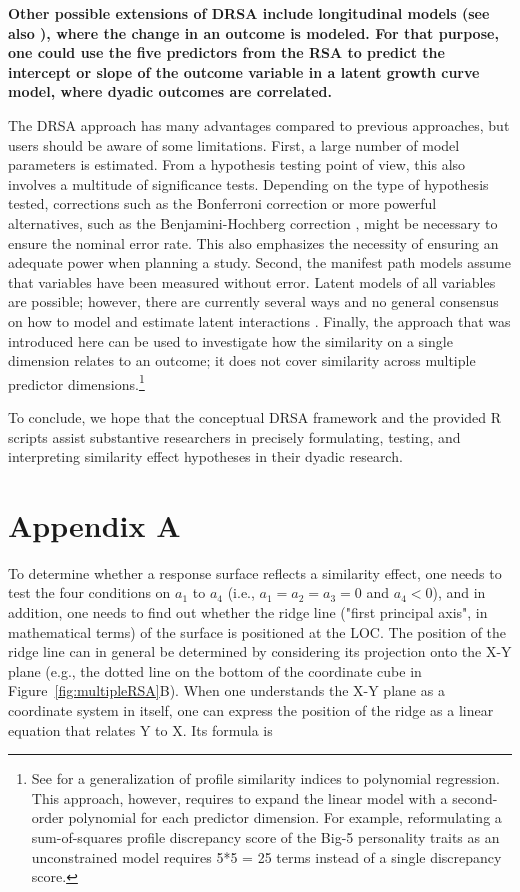 \documentclass[jou,a4paper,draftfirst]{apa6}
\newcommand{\added}[1]{\textcolor{colour_added}{\bf{#1}}}
\begin{document}
\added{Other possible extensions of DRSA include longitudinal models (see also \nptextcite{NestlerEtAl2015}), where the change in an outcome is modeled. For that purpose, one could use the five predictors from the RSA to predict the intercept or slope of the outcome variable in a latent growth curve model, where dyadic outcomes are correlated.}

The DRSA approach has many advantages compared to previous approaches, but users should be aware of some limitations. First, a large number of model parameters is estimated. From a hypothesis testing point of view, this also involves a multitude of significance tests. Depending on the type of hypothesis tested, corrections such as the Bonferroni correction \parencite{bonferroni_il_1935} or more powerful alternatives, such as the Benjamini-Hochberg correction \parencite{benjamini_controlling_1995}, might be necessary to ensure the nominal error rate. This also emphasizes the necessity of ensuring an adequate power when planning a study.
Second, the manifest path models assume that variables have been measured without error. Latent models of all variables are possible; however, there are currently several ways and no general consensus on how to model and estimate latent interactions \parencite[e.g.,][]{harring_comparison_2012}.
Finally, the approach that was introduced here can be used to investigate how the similarity on a single dimension relates to an outcome; it does not cover similarity across multiple predictor dimensions.\footnote{See \textcite{edwards_study_1994} for a generalization of profile similarity indices to polynomial regression. This approach, however, requires to expand the linear model with a second-order polynomial for each predictor dimension. For example, reformulating a sum-of-squares profile discrepancy score of the Big-5 personality traits as an unconstrained model requires 5*5 = 25 terms instead of a single discrepancy score.}

To conclude, we hope that the conceptual DRSA framework and the provided R scripts assist substantive researchers in precisely formulating, testing, and interpreting similarity effect hypotheses in their dyadic research.

\printbibliography


\section{Appendix A}

To determine whether a response surface reflects a similarity effect, one needs to test the four conditions on $a_1$ to $a_4$ (i.e., $a_1 = a_2 = a_3 = 0$ and $a_4 < 0$), and in addition, one needs to find out whether the ridge line ("first principal axis", in mathematical terms) of the surface is positioned at the LOC. The position of the ridge line can in general be determined by considering its projection onto the X-Y plane (e.g., the dotted line on the bottom of the coordinate cube in Figure~\ref{fig:multipleRSA}B). When one understands the X-Y plane as a coordinate system in itself, one can express the position of the ridge as a linear equation that relates Y to X. Its formula is \parencite[see][]{Edwards2007}
\end{document}
